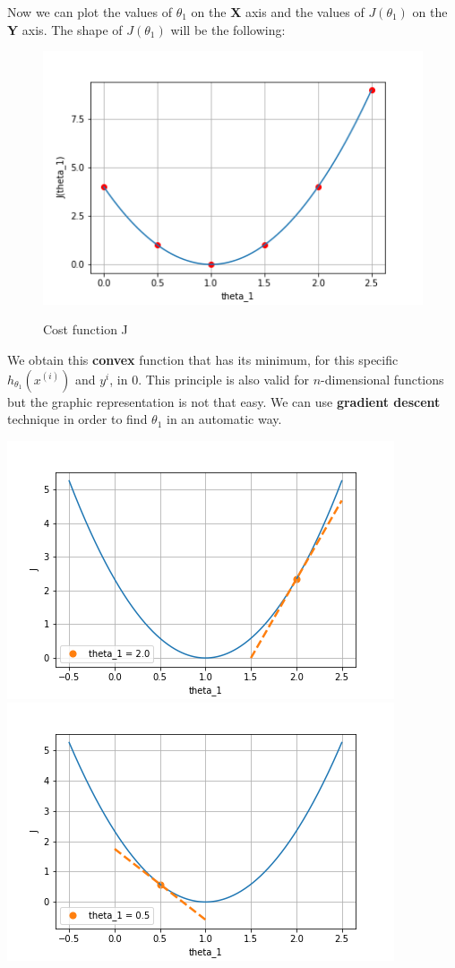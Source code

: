 Now we can plot the values of $\theta_{1}$ on the \textbf{X} axis and the values of $J(\theta_{1})$ on the \textbf{Y} axis. The shape of $J(\theta_{1})$ will be the following:
\begin{figure}[h]
    \centering
    \includegraphics[scale = 0.7]{images/J.png}
    \label{Fig 1}
    \caption{Cost function J}
\end{figure}\newline
We obtain this \textbf{convex} function that has its minimum, for this specific $h_{\theta_{1}}(x^{(i)})$ and $y^{i}$, in 0. This principle is also valid for $n$-dimensional functions but the graphic representation is not that easy.\newline
We can use \textbf{gradient descent} technique in order to find $\theta_{1}$ in an automatic way.
\begin{flushleft}
    \includegraphics[scale=0.5]{images/partial derivative.png}
    \includegraphics[scale=0.5]{images/partial derivative_1.png}
\end{flushleft}
